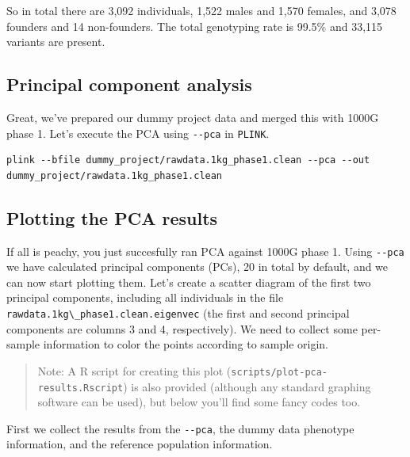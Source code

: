\documentclass[
]{book}
\newcommand{\passthrough}[1]{#1}
\begin{document}
So in total there are 3,092 individuals, 1,522 males and 1,570 females, and 3,078 founders and 14 non-founders. The total genotyping rate is 99.5\% and 33,115 variants are present.

\hypertarget{principal-component-analysis}{%
\subsection{Principal component analysis}\label{principal-component-analysis}}

Great, we've prepared our dummy project data and merged this with 1000G phase 1. Let's execute the PCA using \passthrough{\lstinline!--pca!} in \passthrough{\lstinline!PLINK!}.

\begin{lstlisting}
plink --bfile dummy_project/rawdata.1kg_phase1.clean --pca --out dummy_project/rawdata.1kg_phase1.clean
\end{lstlisting}

\hypertarget{plotting-the-pca-results}{%
\subsection{Plotting the PCA results}\label{plotting-the-pca-results}}

If all is peachy, you just succesfully ran PCA against 1000G phase 1. Using \passthrough{\lstinline!--pca!} we have calculated principal components (PCs), 20 in total by default, and we can now start plotting them. Let's create a scatter diagram of the first two principal components, including all individuals in the file \passthrough{\lstinline!rawdata.1kg\_phase1.clean.eigenvec!} (the first and second principal components are columns 3 and 4, respectively). We need to collect some per-sample information to color the points according to sample origin.

\begin{quote}
Note: A R script for creating this plot (\passthrough{\lstinline!scripts/plot-pca-results.Rscript!}) is also provided (although any standard graphing software can be used), but below you'll find some fancy codes too.
\end{quote}

First we collect the results from the \passthrough{\lstinline!--pca!}, the dummy data phenotype information, and the reference population information.
\end{document}
